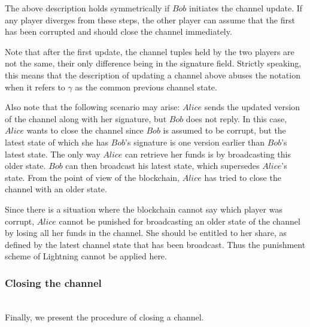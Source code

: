     The above description holds symmetrically if $Bob$ initiates the channel update. If
    any player diverges from these steps, the other player can assume that the first has
    been corrupted and should close the channel immediately.

    Note that after the first update, the channel tuples held by the two players are not
    the same, their only difference being in the signature field. Strictly speaking, this
    means that the description of updating a channel above abuses the notation when it
    refers to $\gamma$ as the common previous channel state.

    Also note that the following scenario may arise: $Alice$ sends the updated version of
    the channel along with her signature, but $Bob$ does not reply. In this case, $Alice$
    wants to close the channel since $Bob$ is assumed to be corrupt, but the latest state
    of which she has $Bob$'s signature is one version earlier than $Bob$'s latest state.
    The only way $Alice$ can retrieve her funds is by broadcasting this older state. $Bob$
    can then broadcast his latest state, which supersedes $Alice$'s state. From the point
    of view of the blockchain, $Alice$ has tried to close the channel with an older state.

    Since there is a situation where the blockchain cannot say which player was corrupt,
    $Alice$ cannot be punished for broadcasting an older state of the channel by losing
    all her funds in the channel. She should be entitled to her share, as defined by the
    latest channel state that has been broadcast. Thus the punishment scheme of Lightning
    cannot be applied here.

    \subsubsection{Closing the channel} \ \\

    Finally, we present the procedure of closing a channel.

